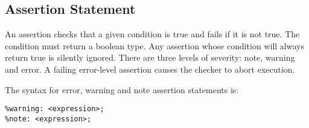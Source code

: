 
\subsection{Assertion Statement}
{
	An assertion checks that a given
	condition is true and fails if it is not true.
	The condition must return a boolean type.
	Any assertion whose condition will always return
	true is silently ignored.
	There are three levels of severity: note, warning and error.
	A failing error-level assertion causes the checker to abort execution.
	
	The syntax for error, warning and note assertion statements is:
	\begin{lstlisting}[texcl = true, language = MAIA]
%error: <expression>;
%warning: <expression>;
%note: <expression>;
	\end{lstlisting}
}
